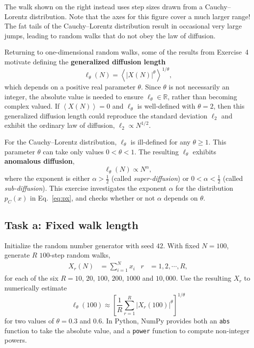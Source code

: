 \documentclass[12 pt]{article} %
\newcommand{\Rbb}{\ensuremath{\mathbb R} }
\newcommand{\al}{\ensuremath{\alpha} }
\newcommand{\vev}[1]{\ensuremath{\left\langle #1 \right\rangle} }
\newcommand{\eq}[1]{Eq.~\ref{#1}}
\begin{document}
The walk shown on the right instead uses step sizes drawn from a Cauchy--Lorentz distribution.
Note that the axes for this figure cover a much larger range!
The fat tails of the Cauchy--Lorentz distribution result in occasional very large jumps, leading to random walks that do not obey the law of diffusion.

Returning to one-dimensional random walks, some of the results from Exercise~4 motivate defining the \textbf{generalized diffusion length}
\begin{equation}
  \label{eq:diff_length}
  \ell_{\theta}(N) = \vev{|X(N)|^{\theta}}^{1 / \theta},
\end{equation}
which depends on a positive real parameter $\theta$.
Since $\theta$ is not necessarily an integer, the absolute value is needed to ensure $\ell_{\theta} \in \Rbb$, rather than becoming complex valued.
If $\vev{X(N)} = 0$ and $\ell_{\theta}$ is well-defined with $\theta = 2$, then this generalized diffusion length could reproduce the standard deviation $\ell_2$ and exhibit the ordinary law of diffusion, $\ell_2 \propto N^{1 / 2}$.

For the Cauchy--Lorentz distribution, $\ell_{\theta}$ is ill-defined for any $\theta \geq 1$.
This parameter $\theta$ can take only values $0 < \theta < 1$.
The resulting $\ell_{\theta}$ exhibits \textbf{anomalous diffusion},
\begin{equation*}
  \ell_{\theta}(N) \propto N^{\al},
\end{equation*}
where the exponent is either $\al > \frac{1}{2}$ (called \textit{super-diffusion}) or $0 < \al < \frac{1}{2}$ (called \textit{sub-diffusion}).
This exercise investigates the exponent \al for the distribution $p_C(x)$ in \eq{eq:px}, and checks whether or not \al depends on $\theta$.

\newpage %
\subsection*{Task a: Fixed walk length}
Initialize the random number generator with seed $42$.
With fixed $N = 100$, generate $R$ $100$-step random walks,
\begin{align*}
  X_r(N) & = \sum_{i = 1}^N x_i &
  r & = 1, 2, \cdots, R,
\end{align*}
for each of the six $R = 10$, $20$, $100$, $200$, $1000$ and $10{,}000$.
Use the resulting $X_r$ to numerically estimate
\begin{equation*}
  \ell_{\theta}(100) \approx \left[\frac{1}{R} \sum_{r = 1}^R \left|X_r(100)\right|^{\theta}\right]^{1 / \theta}
\end{equation*}
for two values of $\theta = 0.3$ and $0.6$.
In Python, NumPy provides both an \texttt{abs} function to take the absolute value, and a \texttt{power} function to compute non-integer powers.
\end{document}
